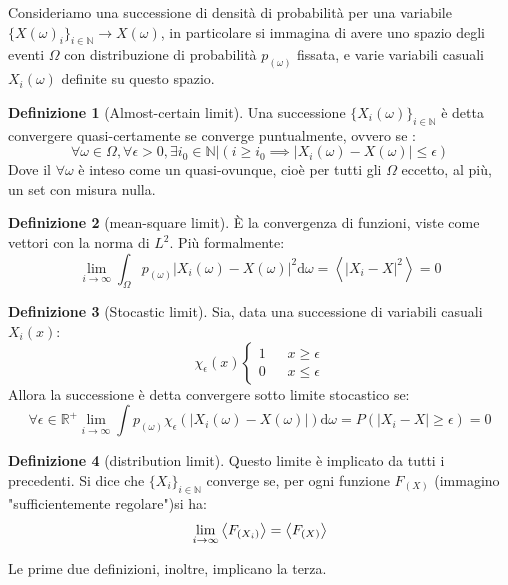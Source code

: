 \documentclass[a4paper,12pt]{article}
\renewcommand{\arg}[1]{_{(#1)}}
\theoremstyle{plain}
\theoremstyle{definition}
\newtheorem{defn}{Definizione}[section]
\newcommand{\ave}[1]{\left\langle#1\right\rangle }
\renewcommand{\d}{\text{d}}
\theoremstyle{remark}
\begin{document}
Consideriamo una successione di densità di probabilità per una variabile $\{X(\omega)_i\}_{i\in \mathbb{N}}\rightarrow X(\omega)$, in particolare si immagina di avere uno spazio degli eventi $\Omega$ con distribuzione di probabilità $p\arg{\omega}$ fissata, e varie variabili casuali $X_i(\omega)$ definite su questo spazio.
\begin{defn}[Almost-certain limit]
	Una successione  $\{X_i(\omega)\}_{i\in\mathbb{N}}$ è detta convergere quasi-certamente se converge puntualmente, ovvero se :
	\[\forall \omega\in\Omega,\forall \epsilon>0,\exists i_0\in \mathbb{N} | \left(i\ge i_0\implies |X_i(\omega)-X(\omega)|\le\epsilon\right)	\]
	Dove il $\forall \omega$ è inteso come un quasi-ovunque, cioè per tutti gli $\Omega$ eccetto, al più,  un set con misura nulla.
\end{defn}
\begin{defn}[mean-square limit]
	È la convergenza di funzioni, viste come vettori con la norma di $L^2$. Più formalmente:
	\[\lim_{i\rightarrow\infty}\int_\Omega p\arg{\omega}	|X_i({\omega})-X({\omega})|^2	\d\omega=\ave{|X_i-X|^2}=0\]
	\label{ms}
\end{defn}
\begin{defn}[Stocastic limit]
	Sia, data una successione di variabili casuali $X_i(x)$: \[\chi_\epsilon(x) \begin{cases}
	1\:\:\;\;\;\;x\ge\epsilon\\
	0\:\:\;\;\;\;x\le\epsilon
	\end{cases}
	\]
	Allora la successione è detta convergere sotto limite stocastico se:
	\[\forall{\epsilon\in \mathbb{R}^+}\lim_{i\rightarrow\infty}\int p\arg{\omega} \chi_\epsilon(|X_i(\omega)-X(\omega)|) \d \omega=P(|X_i-X|\ge \epsilon)=0	\]
\end{defn}
\begin{defn}[distribution limit]\label{distr}
	Questo limite è implicato da tutti i precedenti. Si dice che $\{X_i\}_{i\in\mathbb{N}}$ converge se, per ogni funzione $F\arg{X}$ (immagino "sufficientemente regolare")si ha:
	\[\lim_{i\rightarrow\infty}\expval{F\arg{X_i}}=\expval{F\arg{X}}	\] 
\end{defn}
Le prime due definizioni, inoltre, implicano la terza.
\end{document}
